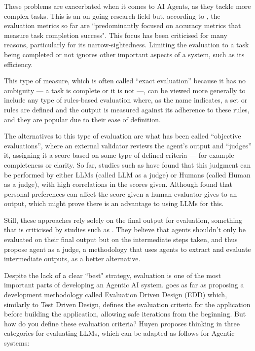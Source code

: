 \documentclass[a4paper]{report}
\begin{document}
These problems are exacerbated when it comes to AI Agents, as they tackle more complex tasks. This is an on-going research field but, according to \cite{krishnan2025aiagentsevolutionarchitecture}, the evaluation metrics so far are ``predominantly focused on accuracy metrics that measure task completion success". This focus has been criticised for many reasons, particularly for its narrow-sightedness. Limiting the evaluation to a task being completed or not ignores other important aspects of a system, such as its efficiency.

This type of measure, which is often called ``exact evaluation'' because it has no ambiguity --- a task is complete or it is not ---, can be viewed more generally to include any type of rules-based evaluation where, as the name indicates, a set or rules are defined and the output is measured against its adherence to these rules, and they are popular due to their ease of definition.

The alternatives to this type of evaluation are what has been called ``objective evaluations'', where an external validator reviews the agent's output and ``judges'' it, assigning it a score based on some type of defined criteria --- for example completeness or clarity. So far, studies such as \cite{wang2025replacehumanevaluators} have found that this judgment can be performed by either LLMs (called LLM as a judge) or Humans (called Human as a judge), with high correlations in the scores given. Although \cite{hu2023decipher} found that personal preferences can affect the score given a human evaluator gives to an output, which might prove there is an advantage to using LLMs for this.

Still, these approaches rely solely on the final output for evaluation, something that is criticised by studies such as \cite{zhuge2024agentasajudgeevaluateagentsagents}. They believe that agents shouldn't only be evaluated on their final output but on the intermediate steps taken, and thus propose agent as a judge, a methodology that uses agents to extract and evaluate intermediate outputs, as a better alternative.

Despite the lack of a clear ``best" strategy, evaluation is one of the most important parts of developing an Agentic AI system. \cite{aiebook2025} goes as far as proposing a development methodology called Evaluation Driven Design (EDD) which, similarly to Test Driven Design, defines the evaluation criteria for the application before building the application, allowing safe iterations from the beginning. But how do you define these evaluation criteria? Huyen proposes thinking in three categories for evaluating LLMs, which can be adapted as follows for Agentic systems:
\end{document}
